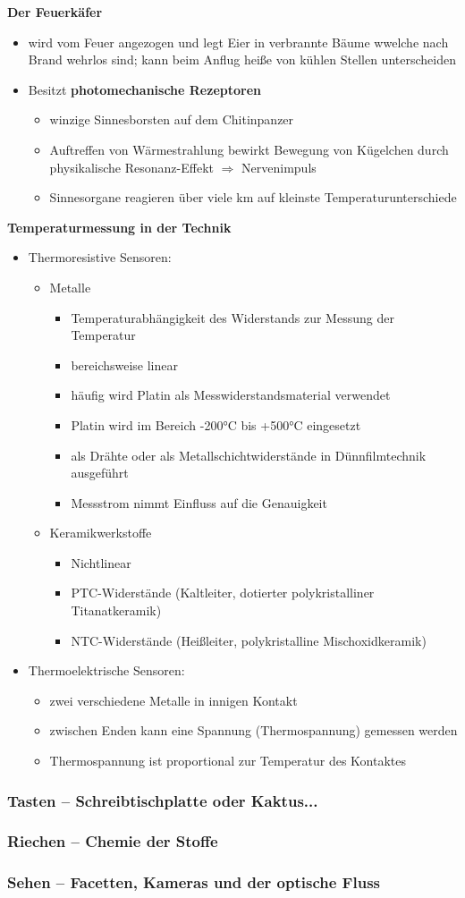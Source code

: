\textbf{Der Feuerkäfer}
\begin{itemize}
\setlength\itemsep{0em}
\item wird vom Feuer angezogen und legt Eier in verbrannte Bäume wwelche nach Brand \glqq wehrlos\grqq{} sind; kann beim Anflug heiße von kühlen Stellen unterscheiden
\item Besitzt \textbf{photomechanische Rezeptoren}
\begin{itemize}
\item winzige Sinnesborsten auf dem Chitinpanzer
\item Auftreffen von Wärmestrahlung bewirkt Bewegung von Kügelchen durch physikalische Resonanz-Effekt $\Rightarrow$ Nervenimpuls
\item Sinnesorgane reagieren über viele km auf kleinste Temperaturunterschiede
\end{itemize}
\end{itemize}

\textbf{Temperaturmessung in der Technik}
\begin{itemize}
\item Thermoresistive Sensoren:
\begin{itemize}
\item Metalle
\begin{itemize}
\item Temperaturabhängigkeit des Widerstands zur Messung der Temperatur
\item bereichsweise linear
\item häufig wird Platin als Messwiderstandsmaterial verwendet
\item Platin wird im Bereich -200°C bis +500°C eingesetzt
\item als Drähte oder als Metallschichtwiderstände in Dünnfilmtechnik ausgeführt
\item Messstrom nimmt Einfluss auf die Genauigkeit
\end{itemize}
\item Keramikwerkstoffe
\begin{itemize}
\item Nichtlinear
\item PTC-Widerstände (Kaltleiter, dotierter polykristalliner Titanatkeramik)
\item NTC-Widerstände (Heißleiter, polykristalline Mischoxidkeramik)
\end{itemize}
\end{itemize}
\item Thermoelektrische Sensoren:
\begin{itemize}
\item zwei verschiedene Metalle in innigen Kontakt
\item zwischen Enden kann eine Spannung (Thermospannung) gemessen werden
\item Thermospannung ist proportional zur Temperatur des Kontaktes
\end{itemize}
\end{itemize}
\subsubsection{Tasten – Schreibtischplatte oder Kaktus...}
\subsubsection{Riechen – Chemie der Stoffe}
\subsubsection{Sehen – Facetten, Kameras und der optische Fluss}
